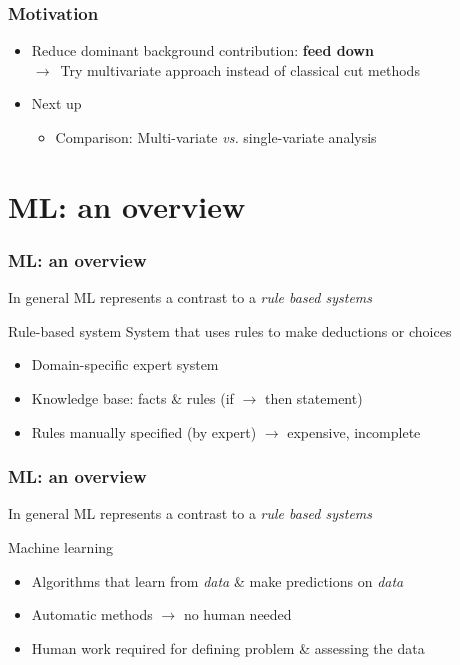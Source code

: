 \documentclass{beamer}
\begin{document}
{
\begin{frame}
    \frametitle{Motivation}
    \begin{itemize}
        \item Reduce dominant background contribution: \textbf{feed down}\\\hspace*{5mm}$\to$~Try multivariate approach instead of classical cut methods\\\vspace*{5mm}
        \item Next up
        \begin{itemize}
            \item Comparison: Multi-variate \emph{vs.} single-variate analysis
        \end{itemize}
     \end{itemize}
\end{frame}
}


\section{ML: an overview} %

\begin{frame}
    \frametitle{ML: an overview}
    In general ML represents a contrast to a \emph{rule based systems}
    \begin{block}{Rule-based system}
        System that uses rules to make deductions or choices
        \begin{itemize}
            \item<1-> Domain-specific expert system
            \item<2-> Knowledge base: facts \& rules (if $\to$ then statement)
            \item<3-> Rules manually specified (by expert) $\to$ expensive, incomplete
        \end{itemize}
    \end{block}
\end{frame}


\begin{frame}
    \frametitle{ML: an overview}
    In general ML represents a contrast to a \emph{rule based systems}
    \begin{block}{Machine learning}
        \begin{itemize}
            \item<1-> Algorithms that learn from \emph{data} \& make predictions on \emph{data}
            \item<2-> Automatic methods $\to$ no human needed
            \item<3-> Human work required for defining problem \& assessing the data
        \end{itemize}
    \end{block}
\end{frame}
\end{document}
